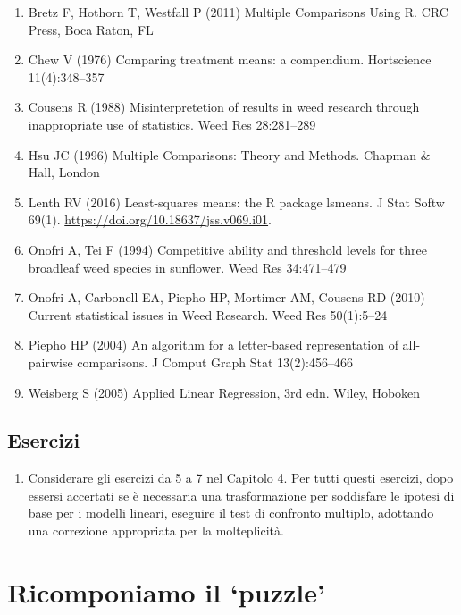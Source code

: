 \documentclass[
  12pt,
]{book}
\providecommand{\tightlist}{%
  \setlength{\itemsep}{0pt}\setlength{\parskip}{0pt}}
\begin{document}
\begin{enumerate}
\def\labelenumi{\arabic{enumi}.}
\tightlist
\item
  Bretz F, Hothorn T, Westfall P (2011) Multiple Comparisons Using R. CRC Press, Boca Raton, FL
\item
  Chew V (1976) Comparing treatment means: a compendium. Hortscience 11(4):348--357
\item
  Cousens R (1988) Misinterpretetion of results in weed research through inappropriate use of statistics. Weed Res 28:281--289
\item
  Hsu JC (1996) Multiple Comparisons: Theory and Methods. Chapman \& Hall, London
\item
  Lenth RV (2016) Least-squares means: the R package lsmeans. J Stat Softw 69(1). \url{https://doi.org/10.18637/jss.v069.i01}.
\item
  Onofri A, Tei F (1994) Competitive ability and threshold levels for three broadleaf weed species in sunflower. Weed Res 34:471--479
\item
  Onofri A, Carbonell EA, Piepho HP, Mortimer AM, Cousens RD (2010) Current statistical issues in Weed Research. Weed Res 50(1):5--24
\item
  Piepho HP (2004) An algorithm for a letter-based representation of all-pairwise comparisons. J Comput Graph Stat 13(2):456--466
\item
  Weisberg S (2005) Applied Linear Regression, 3rd edn. Wiley, Hoboken
\end{enumerate}

\hypertarget{esercizi-2}{%
\section{Esercizi}\label{esercizi-2}}

\begin{enumerate}
\def\labelenumi{\arabic{enumi}.}
\tightlist
\item
  Considerare gli esercizi da 5 a 7 nel Capitolo 4. Per tutti questi esercizi, dopo essersi accertati se è necessaria una trasformazione per soddisfare le ipotesi di base per i modelli lineari, eseguire il test di confronto multiplo, adottando una correzione appropriata per la molteplicità.
\end{enumerate}

\hypertarget{ricomponiamo-il-puzzle}{%
\chapter{Ricomponiamo il `puzzle'}\label{ricomponiamo-il-puzzle}}
\end{document}
